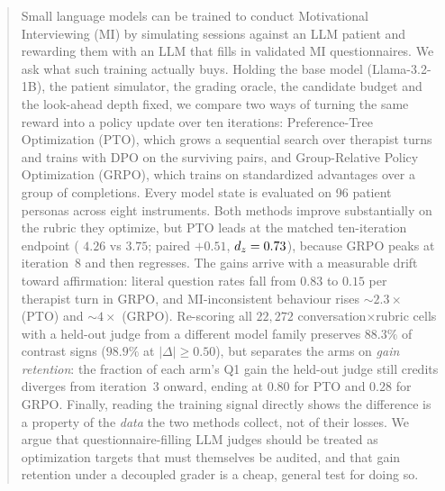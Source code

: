\begin{abstract}
Small language models can be trained to conduct Motivational Interviewing (MI) by
simulating sessions against an LLM patient and rewarding them with an LLM that fills in
validated MI questionnaires. We ask what such training actually buys. Holding the base
model (Llama-3.2-1B), the patient simulator, the grading oracle, the candidate budget and
the look-ahead depth fixed, we compare two ways of turning the same reward into a policy
update over ten iterations: Preference-Tree Optimization (PTO), which grows a sequential
search over therapist turns and trains with DPO on the surviving pairs, and Group-Relative
Policy Optimization (GRPO), which trains on standardized advantages over a group of
completions. Every model state is evaluated on 96 patient personas across eight
instruments.
%
Both methods improve substantially on the rubric they optimize, but PTO leads at the
matched ten-iteration endpoint (\QQ{} $4.26$ vs $3.75$; paired $+0.51$, $\dz{}=0.73$),
because GRPO peaks at iteration~8 and then regresses. The gains arrive with a measurable
drift toward affirmation: literal question rates fall from $0.83$ to $0.15$ per therapist
turn in GRPO, and MI-inconsistent behaviour rises ${\sim}2.3\times$ (PTO) and
${\sim}4\times$ (GRPO).
%
Re-scoring all $22{,}272$ conversation$\times$rubric cells with a held-out judge from a
different model family preserves $88.3\%$ of contrast signs ($98.9\%$ at
$|\Delta|\!\ge\!0.50$), but separates the arms on \emph{gain retention}: the fraction of
each arm's Q1 gain the held-out judge still credits diverges from iteration~3 onward,
ending at $0.80$ for PTO and $0.28$ for GRPO. Finally, reading the training signal
directly shows the difference is a property of the \emph{data} the two methods collect,
not of their losses. We argue that questionnaire-filling LLM judges should be treated as
optimization targets that must themselves be audited, and that gain retention under a
decoupled grader is a cheap, general test for doing so.
\end{abstract}
